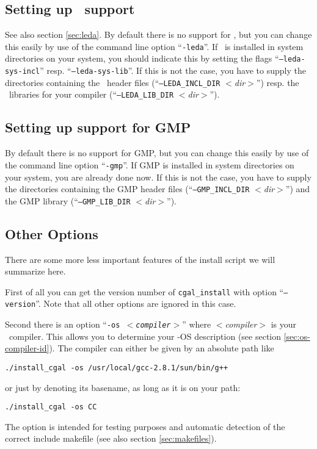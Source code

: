 \subsection{Setting up \leda\ support}\label{sec:leda-setup}

See also section \ref{sec:leda}. By default there is no support for
\leda, but you can change this easily by use of the command line
option ``\texttt{-leda}''. If \leda\ is installed in system
directories on your system, you should indicate this by setting the
flags ``{\tt --leda-sys-incl}'' resp.  ``\texttt{--leda-sys-lib}''. If
this is not the case, you have to supply the directories containing
the \leda\ header files (``\texttt{--LEDA\_INCL\_DIR}
\textit{$<$dir$>$}'') resp. the \leda\ libraries for your compiler
(``\texttt{--LEDA\_LIB\_DIR} {\it $<$dir$>$}'').

\subsection{Setting up support for GMP}\label{sec:gmp-setup}

By default there is no support for GMP, but you can change this easily
by use of the command line option ``\texttt{-gmp}''. If GMP is installed
in system directories on your system, you are already done now. If
this is not the case, you have to supply the directories containing
the GMP header files (``\texttt{--GMP\_INCL\_DIR} \textit{$<$dir$>$}'') and
the GMP library (``\texttt{--GMP\_LIB\_DIR} \textit{$<$dir$>$}'').

\subsection{Other Options}\label{sec:other-options}

There are some more less important features of the install script
we will summarize here. 

First of all you can get the version number of \texttt{cgal\_install}
with option ``\texttt{--version}''. Note that all other options are
ignored in this case.

Second there is an option ``\texttt{-os \textit{$<$compiler$>$}}''
where \textit{$<$compiler$>$} is your \CC\ compiler. This allows you
to determine your \cgal-OS description (see section
\ref{sec:os-compiler-id}). The compiler can either be given by an
absolute path like
\begin{verbatim}
./install_cgal -os /usr/local/gcc-2.8.1/sun/bin/g++
\end{verbatim}
or just by denoting its basename, as long as it is on your path:
\begin{verbatim}
./install_cgal -os CC
\end{verbatim}
The option is intended for testing purposes and automatic detection of
the correct include makefile (see also section \ref{sec:makefiles}).

